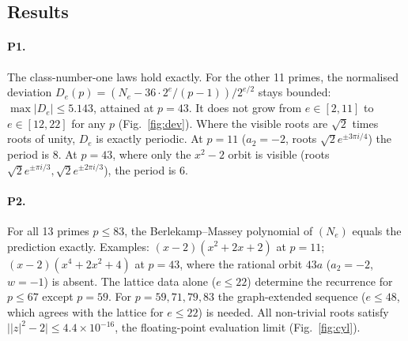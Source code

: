 \documentclass[11pt,a4paper]{article}
\theoremstyle{definition}
\begin{document}
\subsection{Results}
\paragraph{P1.} The class-number-one laws hold exactly. For the other 11 primes, the normalised deviation $D_e(p)=(N_e-36\cdot2^e/(p-1))/2^{e/2}$ stays bounded: $\max|D_e|\le5.143$, attained at $p=43$. It does not grow from $e\in[2,11]$ to $e\in[12,22]$ for any $p$ (Fig.~\ref{fig:dev}). Where the visible roots are $\sqrt2$ times roots of unity, $D_e$ is exactly periodic. At $p=11$ ($a_2=-2$, roots $\sqrt2e^{\pm3\pi i/4}$) the period is $8$. At $p=43$, where only the $x^2-2$ orbit is visible (roots $\sqrt2e^{\pm\pi i/3},\sqrt2e^{\pm2\pi i/3}$), the period is $6$.

\paragraph{P2.} For all 13 primes $p\le83$, the Berlekamp--Massey polynomial of $(N_e)$ equals the prediction exactly. Examples: $(x-2)(x^2+2x+2)$ at $p=11$; $(x-2)(x^4+2x^2+4)$ at $p=43$, where the rational orbit $43a$ ($a_2=-2$, $w=-1$) is absent. The lattice data alone ($e\le22$) determine the recurrence for $p\le67$ except $p=59$. For $p=59,71,79,83$ the graph-extended sequence ($e\le48$, which agrees with the lattice for $e\le22$) is needed. All non-trivial roots satisfy $\big||z|^2-2\big|\le4.4\times10^{-16}$, the floating-point evaluation limit (Fig.~\ref{fig:cyl}).
\end{document}
